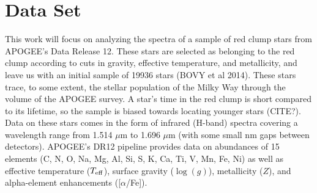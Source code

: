 \documentclass[preprint]{aastex}
\begin{document}
 




\section{Data Set}
\label{sec:data}
This work will focus on analyzing the spectra of a sample of red clump stars from APOGEE's Data Release 12. These stars are selected as belonging to the red clump according to cuts in gravity, effective temperature, and metallicity, and leave us with an initial sample of 19936 stars (BOVY et al 2014). These stars trace, to some extent, the stellar population of the Milky Way through the volume of the APOGEE survey. A star's time in the red clump is short compared to its lifetime, so the sample is biased towards locating younger stars (CITE?). Data on these stars comes in the form of infrared (H-band) spectra covering a wavelength range from 1.514 $\mu$m to 1.696 $\mu$m (with some small nm gaps between detectors). APOGEE's DR12 pipeline provides data on abundances of 15 elements (C, N, O, Na, Mg, Al, Si, S, K, Ca, Ti, V, Mn, Fe, Ni) as well as effective temperature ($T_{\rm eff}$), surface gravity ($\log(g)$), metallicity ($Z$), and alpha-element enhancements ([$\alpha$/Fe]).
\end{document}
